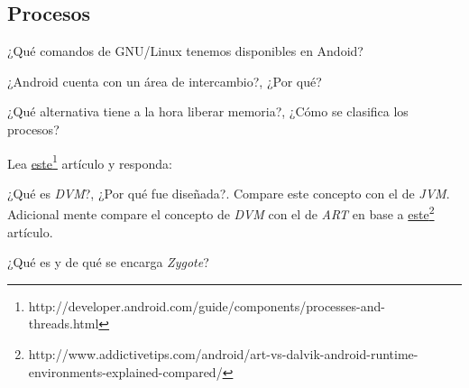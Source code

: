 \subsection{Procesos}
\begin{questions}
  \question ¿Qué comandos de GNU/Linux tenemos disponibles en Andoid?
  
  \question ¿Android cuenta con un área de intercambio?, ¿Por qué?
  
  \question ¿Qué alternativa tiene a la hora liberar memoria?, ¿Cómo se clasifica los procesos?
  
  \question Lea \href{http://developer.android.com/guide/components/processes-and-threads.html}{este}\footnote{http://developer.android.com/guide/components/processes-and-threads.html} artículo y responda:

  \question ¿Qué es \textit{DVM}?, ¿Por qué fue diseñada?. Compare este concepto con el de \textit{JVM}. Adicional mente compare el concepto de \textit{DVM} con el de \textit{ART} en base a \href{http://www.addictivetips.com/android/art-vs-dalvik-android-runtime-environments-explained-compared/}{este}\footnote{http://www.addictivetips.com/android/art-vs-dalvik-android-runtime-environments-explained-compared/} artículo.
  
  \question ¿Qué es y de qué se encarga \textit{Zygote}?
\end{questions}

